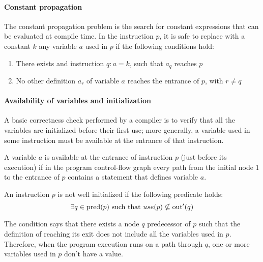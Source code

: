\paragraph*{Constant propagation}
The constant propagation problem is the search for constant expressions that can be evaluated at compile time.
In the instruction $p$, it is safe to replace with a constant $k$ any variable $a$ used in $p$ if the following conditions hold:
\begin{enumerate}
    \item There exists and instruction $q : a = k$, such that $a_q$ reaches $p$
    \item No other definition $a_r$ of variable $a$ reaches the entrance of $p$, with $r \neq q$
\end{enumerate}

\paragraph*{Availability of variables and initialization}
A basic correctness check performed by a compiler is to verify that all the variables are initialized before their first use;
more generally, a variable used in some instruction must be available at the entrance of that instruction.
\begin{definition}
  A variable $a$ is available at the entrance of instruction $p$ (just before its execution) if in the program control-flow graph every path from the initial node $1$ to the entrance of $p$ contains a statement that defines variable $a$.
\end{definition}
\begin{definition}
    An instruction $p$ is not well initialized if the following predicate holds:
    \[ \exists q \in \text{pred}(p) \textnormal{ such that } use(p) \nsubseteq \text{out}^{\prime}(q) \]
\end{definition}
The condition says that there exists a node $q$ predecessor of $p$ such that the definition of reaching its exit does not include all the variables used in $p$.
Therefore, when the program execution runs on a path through $q$, one or more variables used in $p$ don't have a value.